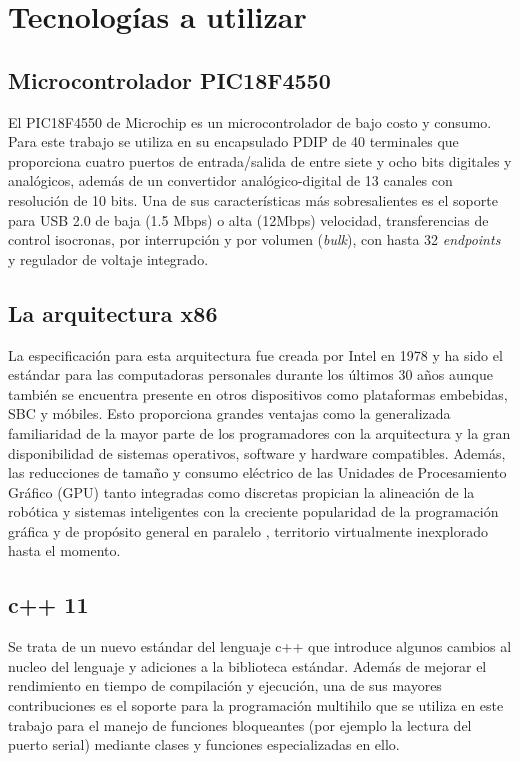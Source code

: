 \documentclass[letterpaper,openright,12pt]{book}
\begin{document}
\section{Tecnologías a utilizar}
\subsection{Microcontrolador PIC18F4550}
El PIC18F4550 de Microchip es un microcontrolador de bajo costo y consumo. Para este trabajo se utiliza en su encapsulado PDIP de 40 terminales que proporciona cuatro puertos de entrada/salida de entre siete y ocho bits digitales y analógicos, además de un convertidor analógico-digital de 13 canales con resolución de 10 bits. Una de sus características más sobresalientes es el soporte para USB 2.0 de baja (1.5 Mbps) o alta (12Mbps) velocidad, transferencias de control  isocronas, por interrupción y por volumen (\emph{bulk}), con hasta 32 \emph{endpoints} y regulador de voltaje integrado. \cite{pic18datasheet}
\subsection{La arquitectura x86}
La especificación para esta arquitectura fue creada por Intel en 1978 y ha sido el estándar para las computadoras personales durante los últimos 30 años {\cite{smith}} aunque también se encuentra presente en otros dispositivos como plataformas embebidas, SBC y móbiles. Esto proporciona grandes ventajas como la generalizada familiaridad de la mayor parte de los programadores con la arquitectura y la gran disponibilidad de sistemas operativos, software y hardware compatibles. Además, las reducciones de tamaño y consumo eléctrico de las Unidades de Procesamiento Gráfico (GPU) tanto integradas como discretas propician la alineación de la robótica y sistemas inteligentes con la creciente popularidad de la programación gráfica y de propósito general en paralelo \cite{nugteren}, territorio virtualmente inexplorado hasta el momento.

\subsection{c++ 11}
Se trata de un nuevo estándar del lenguaje c++ que introduce algunos cambios al nucleo del lenguaje y adiciones a la biblioteca estándar. Además de mejorar el rendimiento en tiempo de compilación y ejecución, una de sus mayores contribuciones es el soporte para la programación multihilo que se utiliza en este trabajo para el manejo de funciones bloqueantes (por ejemplo la lectura del puerto serial) mediante clases y funciones especializadas en ello.
\end{document}
